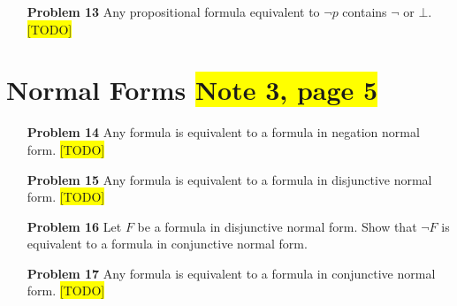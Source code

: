 \documentclass[12pt]{article}
\begin{document}
\begin{enumerate}
\begin{enumerate} [(i)]
          \item $\rightarrow $ and $\bot$ 
            \begin{itemize}
                \item There is no connective in atoms. Thus every atom has property $P$. 
                \item $\top \sim p \rightarrow p \: (\bot \rightarrow p) $; $\bot$ is trivial. Thus $\top$ and $\bot$ has property $P$. 
                \item By induction hypothesis, there exist $F' \sim F$, that contains no connective other than $\rightarrow $  $\bot$.  Clearly, $\neg F \sim \neg F' \sim F' \rightarrow \bot $.  So if a formula $F$ has property P then so does $\neg F$.
                \item $F \wedge G \sim F' \wedge G' \sim \neg ( F' \rightarrow \neg G') \sim [F' \rightarrow (G' \rightarrow \bot)] \rightarrow \bot ] $; \\
                 $F \vee G \sim F' \vee G' \sim \neg F' \rightarrow G' \sim (F' \rightarrow \bot) \rightarrow G'$;  \\
                 $ F \rightarrow G \sim F' \rightarrow G' $\\
                 Thus, for any binary connective $\odot$, if formulas $F$ and $G$ has property $P$, then so does $(F \odot G)$. 
            \end{itemize}
       Then we can conclude that property $P$ holds for all formulas.    
    \end{enumerate}

\item[\textbf{Problem 13}] Any propositional formula equivalent to $\neg p$ contains $\neg$ or $\bot$.   \\   
                     \colorbox{yellow}{[TODO]}
\end{enumerate}


\newpage
\section{Normal Forms \colorbox{yellow}{Note 3, page 5}}
\begin{enumerate}
\item[\textbf{Problem 14}] Any formula is equivalent to a formula in negation normal form.  \colorbox{yellow}{[TODO]}

\item[\textbf{Problem 15}] Any formula is equivalent to a formula in disjunctive normal form.  
\colorbox{yellow}{[TODO]}

\item[\textbf{Problem 16}] Let $F$ be a formula in disjunctive normal form. Show that $\neg F$ is equivalent to a formula in conjunctive normal form. 

\item[\textbf{Problem 17}] Any formula is equivalent to a formula in conjunctive normal form.  
\colorbox{yellow}{[TODO]}


\end{enumerate}
\end{document}
